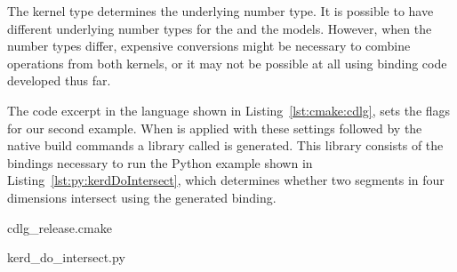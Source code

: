 The kernel type determines the underlying number type. It is possible
to have different underlying number types for the
\iiDandiiiDGeometryKernelPackage{} and the \dDGeometryKernelPackage{}
models. However, when the number types differ, expensive conversions
might be necessary to combine operations from both kernels, or it may
not be possible at all using binding code developed thus far.

The code excerpt in the \cmake{} language shown in
Listing~\ref{lst:cmake:cdlg}, sets the \cmake{} flags for our second
example. When  is applied with these settings
followed by the native build commands a library called
 is generated. This library
consists of the bindings necessary to run the Python example shown in
Listing~\ref{lst:py:kerdDoIntersect}, which determines whether two
segments in four dimensions intersect using the generated binding.

\begin{lstfloat}
  \def\filename{cdlg_release.cmake}%
  
                  {\cmakeDir\filename}
\end{lstfloat}

\begin{lstfloat}
  \def\filename{kerd_do_intersect.py}%
  
                  {\pythonDir\filename}
\end{lstfloat}

